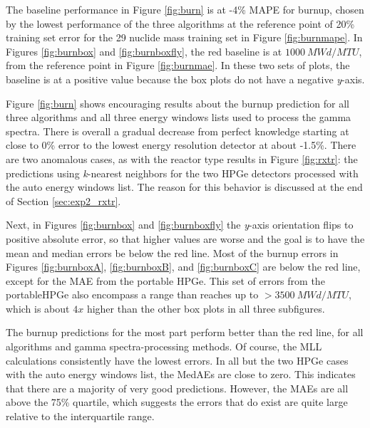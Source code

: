 The baseline performance in Figure \ref{fig:burn} is at -4\% \gls{MAPE} for
burnup, chosen by the lowest performance of the three algorithms at the
reference point of 20\% training set error for the 29 nuclide mass training set
in Figure \ref{fig:burnmape}. In Figures \ref{fig:burnbox} and
\ref{fig:burnboxfly}, the red baseline is at $1000\:MWd/MTU$, from the
reference point in Figure \ref{fig:burnmae}.  In these two sets of plots, the
baseline is at a positive value because the box plots do not have a negative
\textit{y}-axis. 

Figure \ref{fig:burn} shows encouraging results about the burnup prediction
for all three algorithms and all three energy windows lists used to process the
gamma spectra. There is overall a gradual decrease from perfect knowledge
starting at close to 0\% error to the lowest energy resolution detector at
about -1.5\%.  There are two anomalous cases, as with the reactor type results
in Figure \ref{fig:rxtr}: the predictions using \textit{k}-nearest neighbors
for the two \gls{HPGe} detectors processed with the auto energy windows list.
The reason for this behavior is discussed at the end of Section
\ref{sec:exp2_rxtr}. 

Next, in Figures \ref{fig:burnbox} and \ref{fig:burnboxfly} the \textit{y}-axis
orientation flips to positive absolute error, so that higher values are worse
and the goal is to have the mean and median errors be below the red line.  Most
of the burnup errors in Figures \ref{fig:burnboxA}, \ref{fig:burnboxB}, and
\ref{fig:burnboxC} are below the red line, except for the \gls{MAE} from the
portable \gls{HPGe}. This set of errors from the portable\gls{HPGe} also
encompass a range than reaches up to $>3500\:MWd/MTU$, which is about $4x$
higher than the other box plots in all three subfigures. 

The burnup predictions for the most part perform better than the red line, for
all algorithms and gamma spectra-processing methods.  Of course, the \gls{MLL}
calculations consistently have the lowest errors. In all but the two \gls{HPGe}
cases with the auto energy windows list, the \gls{MedAE}s are close to zero.
This indicates that there are a majority  of very good
predictions. However, the \gls{MAE}s are all above the 75\% quartile, which
suggests the errors that do exist are quite large relative to the interquartile
range.  

